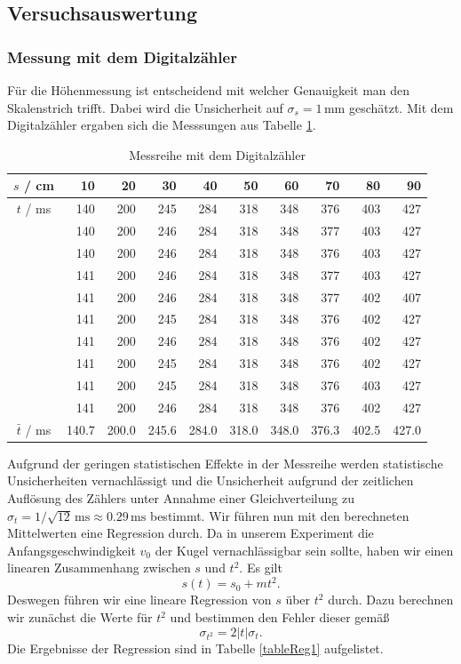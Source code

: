 \documentclass[a4paper, 12pt]{scrartcl}
\begin{document}
\subsection{Versuchsauswertung}

\subsubsection{Messung mit dem Digitalzähler}

Für die Höhenmessung ist entscheidend mit welcher Genauigkeit man den Skalenstrich trifft. Dabei wird die Unsicherheit auf $\sigma_s = 1 \, \mathrm{mm}$ geschätzt. Mit dem Digitalzähler ergaben sich die Messsungen aus Tabelle \ref{tableDz}.

\begin{table}[h]
\begin{center}
\begin{tabular}{c|r|r|r|r|r|r|r|r|r}
$s$ / cm & 10 & 20 & 30 & 40 & 50 & 60 & 70 & 80 & 90 \\
\hline
$t$ / ms & 140 & 200 & 245 & 284 & 318 & 348 & 376 & 403 & 427 \\
         & 140 & 200 & 246 & 284 & 318 & 348 & 377 & 403 & 427 \\
	 & 140 & 200 & 246 & 284 & 318 & 348 & 376 & 403 & 427 \\
	 & 141 & 200 & 246 & 284 & 318 & 348 & 377 & 403 & 427 \\
	 & 141 & 200 & 246 & 284 & 318 & 348 & 377 & 402 & 407 \\
	 & 141 & 200 & 245 & 284 & 318 & 348 & 376 & 402 & 427 \\
	 & 141 & 200 & 246 & 284 & 318 & 348 & 376 & 402 & 427 \\
	 & 141 & 200 & 245 & 284 & 318 & 348 & 376 & 402 & 427 \\
	 & 141 & 200 & 245 & 284 & 318 & 348 & 376 & 403 & 427 \\
	 & 141 & 200 & 246 & 284 & 318 & 348 & 376 & 402 & 427 \\
\hline
$\bar t$ / ms & 140.7 & 200.0 & 245.6 & 284.0 & 318.0 & 348.0 & 376.3 & 402.5 & 427.0
\end{tabular}
\caption{Messreihe mit dem Digitalzähler}
\label{tableDz}
\end{center}
\end{table}

Aufgrund der geringen statistischen Effekte in der Messreihe werden statistische Unsicherheiten vernachlässigt und die Unsicherheit aufgrund der zeitlichen Auflösung des Zählers unter Annahme einer Gleichverteilung zu $\sigma_t = 1/\sqrt{12} \, \mathrm{ms} \approx 0.29 \, \mathrm{ms}$ bestimmt. Wir führen nun mit den berechneten Mittelwerten eine Regression durch. Da in unserem Experiment die Anfangsgeschwindigkeit $v_0$ der Kugel vernachlässigbar sein sollte, haben wir einen linearen Zusammenhang zwischen $s$ und $t^2$. Es gilt
$$s(t) = s_0 + mt^2.$$
Deswegen führen wir eine lineare Regression von $s$ über $t^2$ durch. Dazu berechnen wir zunächst die Werte für $t^2$ und bestimmen den Fehler dieser gemäß
$$\sigma_{t^2} = 2|t|\sigma_t.$$
Die Ergebnisse der Regression sind in Tabelle \ref{tableReg1} aufgelistet.
\end{document}
